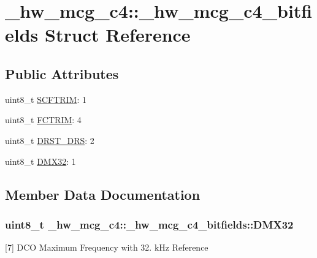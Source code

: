 \hypertarget{struct__hw__mcg__c4_1_1__hw__mcg__c4__bitfields}{}\section{\+\_\+hw\+\_\+mcg\+\_\+c4\+:\+:\+\_\+hw\+\_\+mcg\+\_\+c4\+\_\+bitfields Struct Reference}
\label{struct__hw__mcg__c4_1_1__hw__mcg__c4__bitfields}
\subsection*{Public Attributes}
\begin{DoxyCompactItemize}
\item 
uint8\+\_\+t \hyperlink{struct__hw__mcg__c4_1_1__hw__mcg__c4__bitfields_ae83e105d2de8d7b9df33eee4ceae51e4}{S\+C\+F\+T\+R\+IM}\+: 1
\item 
uint8\+\_\+t \hyperlink{struct__hw__mcg__c4_1_1__hw__mcg__c4__bitfields_a6c5dce14372adef4c1a8e82329d41e79}{F\+C\+T\+R\+IM}\+: 4
\item 
uint8\+\_\+t \hyperlink{struct__hw__mcg__c4_1_1__hw__mcg__c4__bitfields_a6f5e68150ca9d92b8a8c445107bad7fa}{D\+R\+S\+T\+\_\+\+D\+RS}\+: 2
\item 
uint8\+\_\+t \hyperlink{struct__hw__mcg__c4_1_1__hw__mcg__c4__bitfields_a2639e1d1fa9402dea544a29bcf6510e2}{D\+M\+X32}\+: 1
\end{DoxyCompactItemize}


\subsection{Member Data Documentation}
\subsubsection[{\texorpdfstring{D\+M\+X32}{DMX32}}]{\setlength{\rightskip}{0pt plus 5cm}uint8\+\_\+t \+\_\+hw\+\_\+mcg\+\_\+c4\+::\+\_\+hw\+\_\+mcg\+\_\+c4\+\_\+bitfields\+::\+D\+M\+X32}\hypertarget{struct__hw__mcg__c4_1_1__hw__mcg__c4__bitfields_a2639e1d1fa9402dea544a29bcf6510e2}{}\label{struct__hw__mcg__c4_1_1__hw__mcg__c4__bitfields_a2639e1d1fa9402dea544a29bcf6510e2}
\mbox{[}7\mbox{]} D\+CO Maximum Frequency with 32. k\+Hz Reference 
